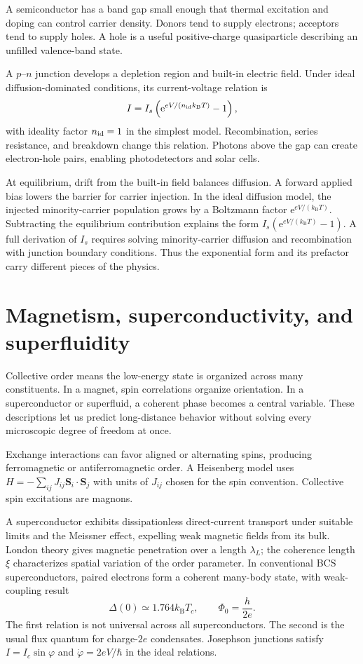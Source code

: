 \documentclass[11pt,oneside]{book}
\newcommand{\ee}{\mathrm{e}}
\newcommand{\vect}[1]{\boldsymbol{#1}}
\newcommand{\kb}{k_{\mathrm B}}
\theoremstyle{reviewstyle}
\begin{document}
A semiconductor has a band gap small enough that thermal excitation and doping can control carrier density. Donors tend to supply electrons; acceptors tend to supply holes. A hole is a useful positive-charge quasiparticle describing an unfilled valence-band state.

A $p$--$n$ junction develops a depletion region and built-in electric field. Under ideal diffusion-dominated conditions, its current-voltage relation is
\begin{equation}I=I_s\left(\ee^{eV/(n_{\rm id}\kb T)}-1\right),\end{equation}
with ideality factor $n_{\rm id}=1$ in the simplest model. Recombination, series resistance, and breakdown change this relation. Photons above the gap can create electron-hole pairs, enabling photodetectors and solar cells.

At equilibrium, drift from the built-in field balances diffusion. A forward applied bias lowers the barrier for carrier injection. In the ideal diffusion model, the injected minority-carrier population grows by a Boltzmann factor $\ee^{eV/(\kb T)}$. Subtracting the equilibrium contribution explains the form $I_s(\ee^{eV/(\kb T)}-1)$. A full derivation of $I_s$ requires solving minority-carrier diffusion and recombination with junction boundary conditions. Thus the exponential form and its prefactor carry different pieces of the physics.

\section{Magnetism, superconductivity, and superfluidity}
Collective order means the low-energy state is organized across many constituents. In a magnet, spin correlations organize orientation. In a superconductor or superfluid, a coherent phase becomes a central variable. These descriptions let us predict long-distance behavior without solving every microscopic degree of freedom at once.

Exchange interactions can favor aligned or alternating spins, producing ferromagnetic or antiferromagnetic order. A Heisenberg model uses $H=-\sum_{ij}J_{ij}\vect S_i\cdot\vect S_j$ with units of $J_{ij}$ chosen for the spin convention. Collective spin excitations are magnons.

A superconductor exhibits dissipationless direct-current transport under suitable limits and the Meissner effect, expelling weak magnetic fields from its bulk. London theory gives magnetic penetration over a length $\lambda_L$; the coherence length $\xi$ characterizes spatial variation of the order parameter. In conventional BCS superconductors, paired electrons form a coherent many-body state, with weak-coupling result
\begin{equation}\Delta(0)\simeq1.764\kb T_c,\qquad \Phi_0=\frac{h}{2e}.\end{equation}
The first relation is not universal across all superconductors. The second is the usual flux quantum for charge-$2e$ condensates. Josephson junctions satisfy $I=I_c\sin\varphi$ and $\dot\varphi=2eV/\hbar$ in the ideal relations.
\end{document}
